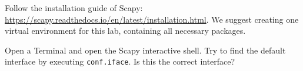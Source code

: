 \documentclass[11pt,a4paper]{article}
\begin{document}
Follow the installation guide of Scapy: \url{https://scapy.readthedocs.io/en/latest/installation.html}.
We suggest creating one virtual environment for this lab, containing all necessary packages. 





\begin{question}
    Open a Terminal and open the Scapy interactive shell. Try to find the default interface by executing \texttt{conf.iface}. Is this the correct interface? 
\end{question}
\end{document}
